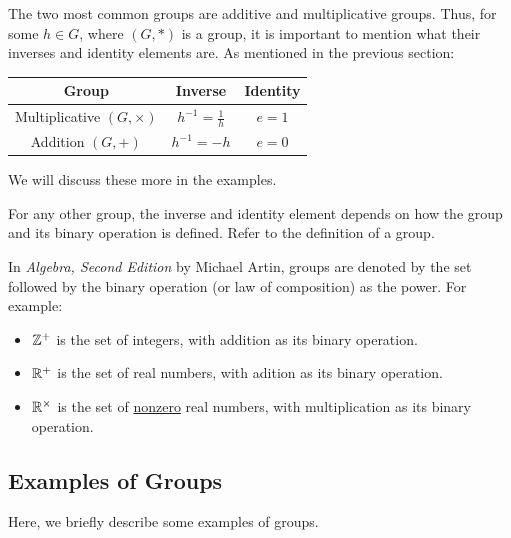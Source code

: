 \documentclass[letterpaper]{article}
\begin{document}
\begin{note*}{}{}
    The two most common groups are additive and multiplicative groups. Thus, for some $h \in G$, where $(G, *)$ is a group, it is important to mention what their inverses and identity elements are. As mentioned in the previous section:
    \begin{center}
        \begin{tabular}{|c|c|c|}
            \hline 
            \textbf{Group} & \textbf{Inverse} & \textbf{Identity} \\ 
            \hline 
            Multiplicative $(G, \times)$ & $h^{-1} = \frac{1}{h}$ & $e = 1$ \\ 
            Addition $(G, +)$ & $h^{-1} = -h$ & $e = 0$ \\ 
            \hline 
        \end{tabular}
    \end{center}
    We will discuss these more in the examples. 

    \bigskip 

    For any other group, the inverse and identity element depends on how the group and its binary operation is defined. Refer to the definition of a group.
\end{note*}

\begin{note*}{}{}
    In \emph{Algebra, Second Edition} by Michael Artin, groups are denoted by the set followed by the binary operation (or law of composition) as the power. For example: 
    \begin{itemize}
        \item $\mathbb{Z}^+$ is the set of integers, with addition as its binary operation.
        \item $\mathbb{R}^+$ is the set of real numbers, with adition as its binary operation. 
        \item $\mathbb{R}^{\times}$ is the set of \underline{nonzero} real numbers, with multiplication as its binary operation.
    \end{itemize} 
\end{note*}

\subsection{Examples of Groups}
Here, we briefly describe some examples of groups. 
\end{document}

